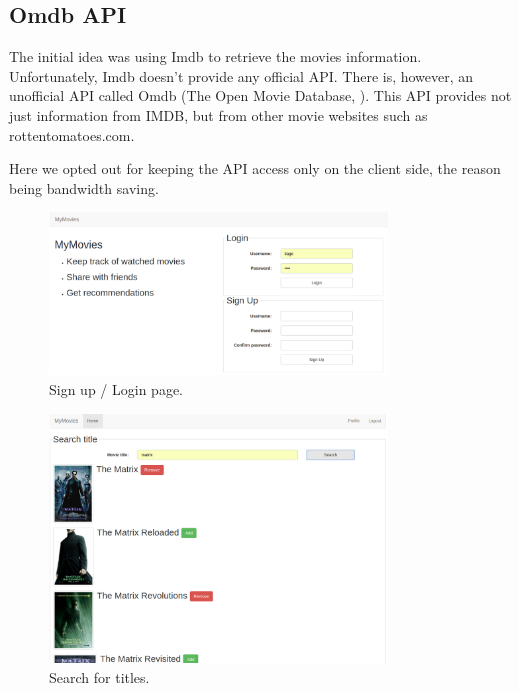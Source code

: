 \subsection{Omdb API} \label{sec:omdb}

The initial idea was using Imdb to retrieve the movies information.
Unfortunately, Imdb doesn't provide any official API. There is, however, an
unofficial API called Omdb (The Open Movie Database, \cite{omdb}). This API
provides not just information from IMDB, but from other movie websites such as
rottentomatoes.com.

Here we opted out for keeping the API access only on the client side, the
reason being bandwidth saving.

\begin{figure}[!htb]
\centering
\includegraphics[width=0.8\textwidth]{fig/01-login.png}
\caption{\label{fig:login}Sign up / Login page.}
\end{figure}

\begin{figure}[!htb]
\centering
\includegraphics[width=0.8\textwidth]{fig/02-search.png}
\caption{\label{fig:search}Search for titles.}
\end{figure}


